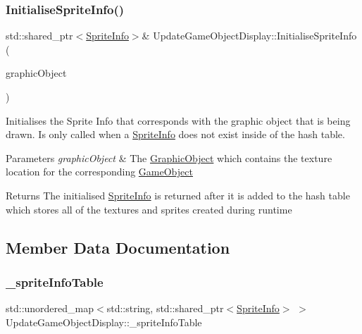 \subsubsection{\texorpdfstring{Initialise\+Sprite\+Info()}{InitialiseSpriteInfo()}}
{\footnotesize\ttfamily std\+::shared\+\_\+ptr$<$\hyperlink{struct_sprite_info}{Sprite\+Info}$>$\& Update\+Game\+Object\+Display\+::\+Initialise\+Sprite\+Info (\begin{DoxyParamCaption}\item[{const \hyperlink{class_graphic_object}{Graphic\+Object} \&}]{graphic\+Object }\end{DoxyParamCaption})\hspace{0.3cm}{\ttfamily [private]}}



Initialises the Sprite Info that corresponds with the graphic object that is being drawn. Is only called when a \hyperlink{struct_sprite_info}{Sprite\+Info} does not exist inside of the hash table. 


\begin{DoxyParams}{Parameters}
{\em graphic\+Object} & The \hyperlink{class_graphic_object}{Graphic\+Object} which contains the texture location for the corresponding \hyperlink{class_game_object}{Game\+Object} \\
\hline
\end{DoxyParams}
\begin{DoxyReturn}{Returns}
The initialised \hyperlink{struct_sprite_info}{Sprite\+Info} is returned after it is added to the hash table which stores all of the textures and sprites created during runtime 
\end{DoxyReturn}


\subsection{Member Data Documentation}
\mbox{\label{class_update_game_object_display_a51ae3f07958294b737885c9a0bd86153}} 
\subsubsection{\texorpdfstring{\+\_\+sprite\+Info\+Table}{\_spriteInfoTable}}
{\footnotesize\ttfamily std\+::unordered\+\_\+map$<$std\+::string, std\+::shared\+\_\+ptr$<$\hyperlink{struct_sprite_info}{Sprite\+Info}$>$ $>$ Update\+Game\+Object\+Display\+::\+\_\+sprite\+Info\+Table\hspace{0.3cm}{\ttfamily [private]}}

